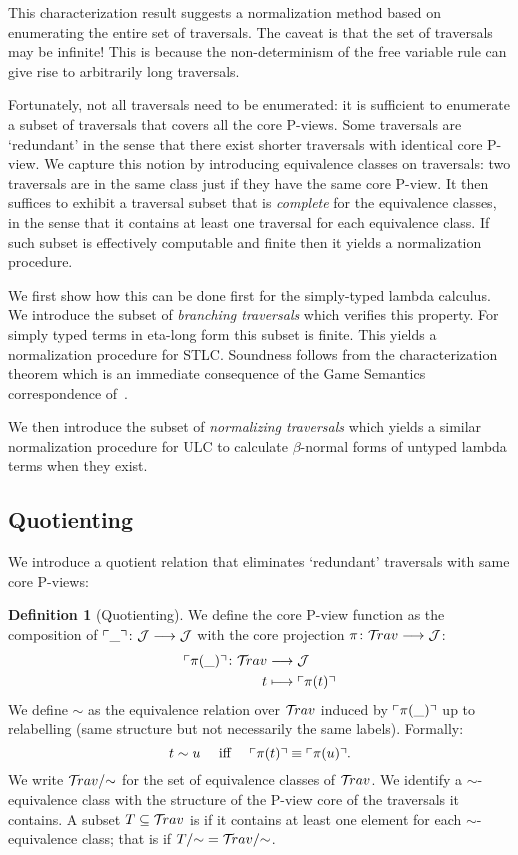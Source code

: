 \documentclass{article}
\theoremstyle{definition}
\newtheorem{definition}{Definition}[section]
\newcommand{\travulc}{\travset}
\def\coresymbol{\pi} %
\newcommand{\core}[1]{\coresymbol(#1)} %
\def\justseqset{\mathcal{J}}
\begin{document}
This characterization result suggests a normalization method based on enumerating the entire set of traversals. The caveat is that the set of traversals may be infinite! This is because the non-determinism of the free variable rule can give rise to arbitrarily long traversals.

Fortunately, not all traversals need to be enumerated: it is sufficient to enumerate a subset of traversals that covers all the core P-views. Some traversals are `redundant' in the sense that there exist shorter traversals with identical core P-view. We capture this notion by introducing equivalence classes on traversals: two traversals are in the same class just if they have the same core P-view. It then suffices to exhibit a traversal subset that is \emph{complete} for the equivalence classes, in the sense that it contains at least one traversal for each equivalence class. If such subset is effectively computable and finite then it yields a normalization procedure.

We first show how this can be done first for the simply-typed lambda calculus. We introduce the subset of \emph{branching traversals} which verifies this property. For simply typed terms in eta-long form this subset is finite. This yields a normalization procedure for STLC.
Soundness follows from the characterization theorem which is an immediate consequence of the Game Semantics correspondence of~\cite{BlumPhd}.

We then introduce the subset of \emph{normalizing traversals} which yields a similar normalization procedure for ULC to calculate $\beta$-normal forms of untyped lambda terms when they exist.

\subsection{Quotienting}

We introduce a quotient relation that eliminates `redundant' traversals with same core P-views:
\begin{definition}[Quotienting]
We define the core P-view function as the composition of $\pview{\_}\colon \justseqset \longrightarrow \justseqset$ with the core projection $\coresymbol\colon\travulc  \longrightarrow \justseqset$:
\begin{align*}
\pview{\core{\_}} \colon \travulc & \longrightarrow \justseqset \\
t & \longmapsto \pview{\core{t}}
\end{align*}
We define $\sim$ as the equivalence relation over $\travulc$ induced by $\pview{\core{\_}}$ up to relabelling (same structure but not necessarily the same labels). Formally:
$$t \sim u \quad \mbox{ iff } \quad  \pview{\core{t}} \equiv \pview{\core{u}} .$$
We write $\travulc/{\sim}$ for the set of equivalence classes of $\travulc$. We identify a $\sim$-equivalence class with the structure of the P-view core of the traversals it contains. A subset $T\subseteq \travulc$ is  if it contains at least one element for each $\sim$-equivalence class; that is if $T/{\sim} = \travulc/{\sim}$.
\end{definition}
\end{document}
